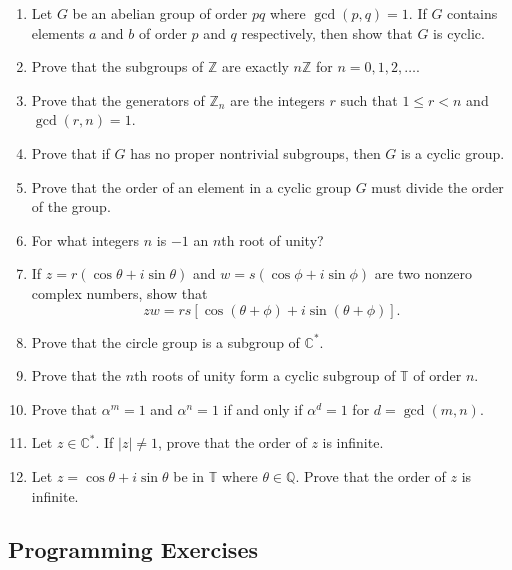 {\begin{enumerate}
 
\item
Let $G$ be an abelian group of order $pq$ where $\gcd(p,q) = 1$.  If
$G$ contains elements $a$ and $b$ of order $p$ and $q$ respectively,
then show that $G$ is cyclic. 
 
 
\item
Prove that the subgroups of ${\mathbb Z}$ are exactly $n{\mathbb Z}$ for $n
= 0, 1, 2, \ldots$. 
 
 
\item
Prove that the generators of ${\mathbb Z}_n$ are the integers $r$ such
that $1 \leq r < n$ and $\gcd(r,n) =  1$. 
 
 
\item
Prove that if $G$ has no proper nontrivial subgroups, then $G$ is a 
cyclic group.
 
 
 
\item
Prove that the order of an element in a cyclic group $G$ must divide
the order of the  group. 
 
 
\item
For what integers $n$ is $-1$ an $n$th root of unity?
 
 
\item
If $z = r( \cos \theta + i \sin \theta)$ and $w = s(\cos \phi + i \sin
\phi)$ are two nonzero complex numbers, show that
\[
zw = rs[ \cos( \theta + \phi)  + i \sin( \theta + \phi)].
\]
 
 
\item
Prove that the circle group is a subgroup of  ${\mathbb C}^*$.
 
 
\item
Prove that the $n$th roots of unity form a cyclic subgroup of ${\mathbb
T}$  of order $n$. 
 
 
\item
Prove that $\alpha^m =1$ and $\alpha^n = 1$ if and only if $\alpha^d = 1$
for $d = \gcd(m,n)$.
 
 
\item
Let $z \in {\mathbb C}^\ast$. If $|z| \neq 1$, prove that the order of
$z$ is infinite. 
 
 
\item
Let $z =\cos \theta + i \sin \theta$ be in ${\mathbb T}$ where $\theta
\in {\mathbb Q}$.  Prove that the order of $z$ is infinite.
 
\end{enumerate}
}
 
 
\subsection*{Programming Exercises}
 
